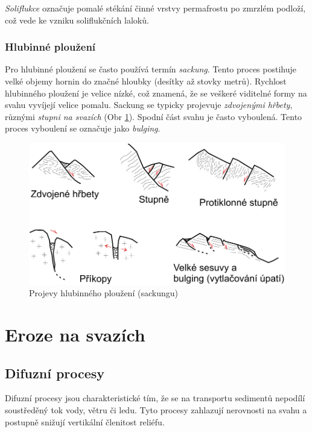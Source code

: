 \emph{Soliflukce} označuje pomalé stékání činné vrstvy permafrostu po zmrzlém podloží, což vede ke vzniku soliflukčních laloků.

\subsubsection{Hlubinné ploužení}
Pro hlubinné ploužení se často používá termín \emph{sackung}. Tento proces postihuje velké objemy hornin do značné hloubky (desítky až stovky metrů). Rychlost hlubinného ploužení je velice nízké, což znamená, že se veškeré viditelné formy na svahu vyvíjejí velice pomalu. Sackung se typicky projevuje \emph{zdvojenými hřbety}, různými \emph{stupni na svazích} (Obr \ref{fig:sackung}). Spodní část svahu je často vyboulená. Tento proces vyboulení se označuje jako \emph{bulging}.

\begin{figure}[h]
	\centering
	\includegraphics[width=1\linewidth]{obrazky/slope/sackung}
	\caption{Projevy hlubinného ploužení (sackungu) \parencite[podle][]{agliardiStructuralConstraintsDeepseated2001}}
	\label{fig:sackung}
\end{figure}

\section{Eroze na svazích}

\subsection{Difuzní procesy}
Difuzní procesy jsou charakteristické tím, že  se na transportu sedimentů nepodílí soustředěný tok vody, větru či ledu. Tyto procesy zahlazují nerovnosti na svahu a postupně snižují vertikální členitost reliéfu. 

